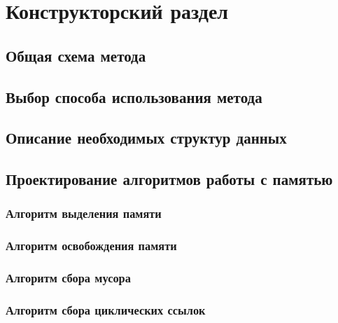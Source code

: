 \chapter{Конструкторский раздел}



\section{Общая схема метода}



\section{Выбор способа использования метода}



\section{Описание необходимых структур данных}



\section{Проектирование алгоритмов работы с памятью}

\subsection{Алгоритм выделения памяти}

\subsection{Алгоритм освобождения памяти}

\subsection{Алгоритм сбора мусора}

\subsection{Алгоритм сбора циклических ссылок}